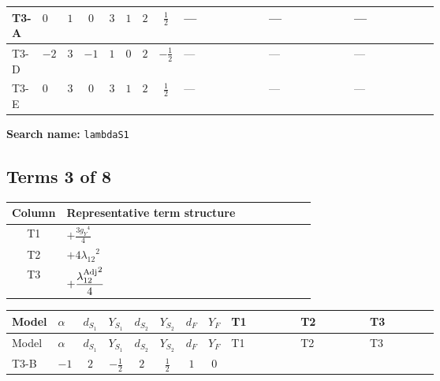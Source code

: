 \documentclass[8pt]{article}
\begin{document}
\begin{landscape}
\begin{longtable}{@{}llcccccc >{\raggedright\arraybackslash}p{0.21\linewidth} >{\raggedright\arraybackslash}p{0.21\linewidth} >{\raggedright\arraybackslash}p{0.21\linewidth}@{}}
\midrule
T3-A & $0$ & $1$ & $0$ & $3$ & $1$ & $2$ & $\frac{1}{2}$ & --- & --- & --- \\
\midrule
T3-D & $-2$ & $3$ & $-1$ & $1$ & $0$ & $2$ & $-\frac{1}{2}$ & --- & --- & --- \\
\midrule
T3-E & $0$ & $3$ & $0$ & $3$ & $1$ & $2$ & $\frac{1}{2}$ & --- & --- & --- \\
\midrule
\bottomrule
\end{longtable}
\clearpage
\noindent\textbf{Search name: }\texttt{lambdaS1}\par\smallskip
\subsection*{Terms 3 of 8}
\begin{center}
\begin{tabular}{@{}c >{\raggedright\arraybackslash}p{0.82\linewidth}@{}}
\toprule
Column & Representative term structure \\
\midrule
T1 & \(\displaystyle +\frac{3 {g_Y}^4}{4}\) \\
\midrule
T2 & \(\displaystyle +4 {\lambda_{12}}^2\) \\
\midrule
T3 & \(\displaystyle +\frac{{\lambda_{12}^{\rm Adj}}^2}{4}\) \\
\midrule
\bottomrule
\end{tabular}
\end{center}
\smallskip
\tiny
\begin{longtable}{@{}llcccccc >{\raggedright\arraybackslash}p{0.21\linewidth} >{\raggedright\arraybackslash}p{0.21\linewidth} >{\raggedright\arraybackslash}p{0.21\linewidth}@{}}
\toprule
Model & $\alpha$ & $d_{S_1}$ & $Y_{S_1}$ & $d_{S_2}$ & $Y_{S_2}$ & $d_F$ & $Y_F$ & T1 & T2 & T3 \\
\midrule
\endfirsthead
\toprule
Model & $\alpha$ & $d_{S_1}$ & $Y_{S_1}$ & $d_{S_2}$ & $Y_{S_2}$ & $d_F$ & $Y_F$ & T1 & T2 & T3 \\
\midrule
\endhead
T3-B & $-1$ & $2$ & $-\frac{1}{2}$ & $2$ & $\frac{1}{2}$ & $1$ & $0$ & \scriptsize\adjustbox{max width=\linewidth}{$\begin{gathered} +\frac{3 {g_Y}^4}{4}\end{gathered}$} & \scriptsize\adjustbox{max width=\linewidth}{$\begin{gathered} +4 {\lambda_{12}}^2\end{gathered}$} & \scriptsize\adjustbox{max width=\linewidth}{$\begin{gathered} +\frac{{\lambda_{12}^{\rm Adj}}^2}{4}\end{gathered}$} \\

\end{longtable}
\end{landscape}
\end{document}
